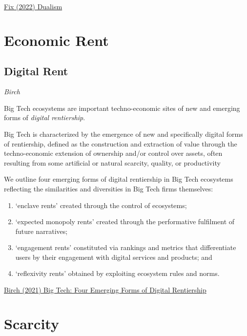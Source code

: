 \documentclass[
]{book}
\begin{document}
\href{https://economicsfromthetopdown.com/2022/08/10/dualism-in-science-theo\%20logy-and-economics/}{Fix (2022) Dualism}

\hypertarget{economic-rent}{%
\chapter{Economic Rent}\label{economic-rent}}

\hypertarget{digital-rent}{%
\section{Digital Rent}\label{digital-rent}}

\emph{Birch}

Big Tech ecosystems are important techno-economic sites of new and
emerging forms of \emph{digital rentiership}.

Big Tech is characterized by the emergence of new and specifically digital forms of rentiership, defined as the construction and extraction of value through the techno-economic extension of ownership and/or control over assets, often resulting from some artificial or natural scarcity, quality, or productivity

We outline four emerging forms of digital rentiership in Big Tech ecosystems reflecting the similarities and diversities in Big Tech firms themselves:

\begin{enumerate}
\def\labelenumi{(\arabic{enumi})}
\item
  `enclave rents' created through the control of ecosystems;
\item
  `expected monopoly rents' created through the performative fulfilment of future narratives;
\item
  `engagement rents' constituted via rankings and metrics that differentiate users by their engagement with digital services and products; and
\item
  `reflexivity rents' obtained by exploiting ecosystem rules and norms.
\end{enumerate}

\href{https://www.tandfonline.com/doi/full/10.1080/09505431.2021.1932794}{Birch (2021) Big Tech: Four Emerging Forms of Digital Rentiership}

\hypertarget{scarcity}{%
\chapter{Scarcity}\label{scarcity}}
\end{document}
